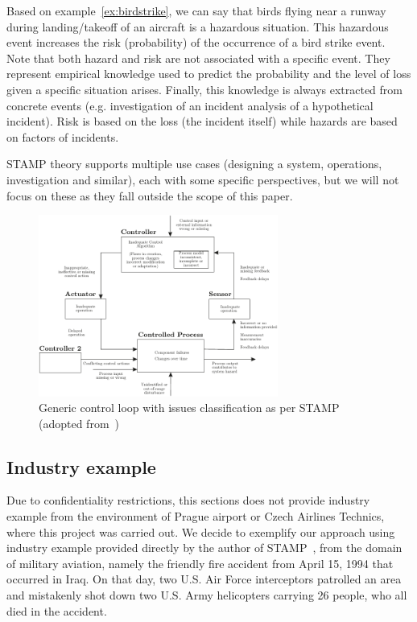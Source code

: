 \documentclass[sw]{iosart2x}
\begin{document}
Based on example~\ref{ex:birdstrike}, we can say that birds flying near a runway during landing/takeoff of an aircraft is a hazardous situation. This hazardous event increases the risk (probability) of the occurrence of a bird strike event. Note that both hazard and risk are not associated with a specific event. They represent empirical knowledge used to predict the probability and the level of loss given a specific situation arises. Finally, this knowledge is always extracted from concrete events (e.g. investigation of an incident analysis of a hypothetical incident). Risk is based on the loss (the incident itself) while hazards are based on factors of incidents.


STAMP theory supports multiple use cases (designing a system, operations, investigation and similar), each with some specific perspectives, but we will not focus on these as they fall outside the scope of this paper.

\begin{figure}
\begin{center}
\includegraphics[width=0.7\textwidth]{images/Fig_Loop.pdf}
\end{center}
\caption{Generic control loop with issues classification as per STAMP (adopted from~\cite{leveson2012engineering})}
\label{fig:loop}
\end{figure}


\subsection{Industry example}\label{sec:example}
Due to confidentiality restrictions, this sections does not provide industry example from the environment of Prague airport or Czech Airlines Technics, where this project was carried out. We decide to exemplify our approach using industry example provided directly by the author of STAMP~\cite{leveson2012engineering}, from the domain of military aviation, namely the friendly fire accident from April 15, 1994 that occurred in Iraq. On that day, two U.S. Air Force interceptors patrolled an area and mistakenly shot down two U.S. Army helicopters carrying 26 people, who all died in the accident. 
\end{document}
